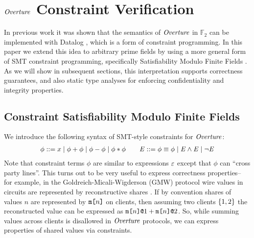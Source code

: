 \section{$\mathit{Overture}$ Constraint Verification}
\label{section-smt}

In previous work it was shown that the semantics of $\mathit{Overture}$ in
$\mathbb{F}_2$ can be implemented with Datalog
\cite{skalka-near-ppdp24}, which is a form of constraint
programming. In this paper we extend this idea to arbitrary prime
fields by using a more general form of SMT constraint programming,
specifically Satisfiability Modulo Finite Fields \cite{SMFF}. As we
will show in subsequent sections, this interpretation supports
correctness guarantees, and also static type analyses for enforcing
confidentiality and integrity properties.

\subsection{Constraint Satisfiability Modulo Finite Fields}

We introduce the following syntax of SMT-style constraints
for $\mathit{Overture}$:
$$
\begin{array}{rcl}
  \phi ::= x \mid \phi + \phi \mid \phi - \phi \mid \phi * \phi  \qquad
  \mathit{E} ::= \phi \equiv \phi \mid \mathit{E} \wedge \mathit{E} \mid \neg\mathit{E}
\end{array}
$$
%
Note that constraint terms $\phi$ are similar to expressions $\varepsilon$
except that $\phi$ can ``cross party lines''. This turns out to be very useful
to express correctness properties-- for example, in the
Goldreich-Micali-Wigderson (GMW) protocol wire values in circuits are
represented by reconstructive shares \cite{evans2018pragmatic}.  If by
convention shares of values $n$ are represented by $\texttt{m[}n\texttt{]}$ on
clients, then assuming two clients $\{ 1,2 \}$ the reconstructed
value can be expressed as $\texttt{m[}n\texttt{]}\texttt{@}1 + \texttt{m[}n\texttt{]}\texttt{@}2$.  So, while summing
values across clients is disallowed in $\mathit{Overture}$ protocols, we can
express properties of shared values via constraints.

%
%  
%  

